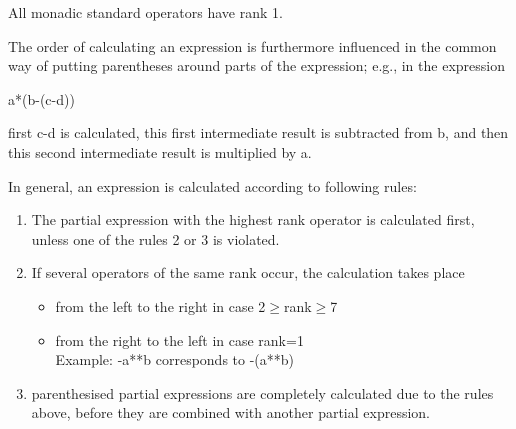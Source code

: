 All monadic standard operators have rank 1.

The order of calculating an expression is furthermore influenced in the
common way of putting parentheses around parts of the expression; e.g.,
in the expression

a*(b-(c-d))

first c-d is calculated, this first intermediate result is subtracted
from b, and then this second intermediate result is multiplied by a.

In general, an expression is calculated according to following rules:
\begin{enumerate}
\item The partial expression with the highest rank operator is
calculated first, unless one of the rules 2 or 3 is violated.
\item If several operators of the same rank occur, the calculation takes
place
\begin{itemize}
\item from the left to the right in case 2$\ge$rank$\ge$7
\item from the right to the left in case rank=1\\
      Example: -a**b corresponds to -(a**b)
\end{itemize}
\item parenthesised partial expressions are completely calculated due to
the rules above, before they are combined with another partial
expression.
\end{enumerate}

